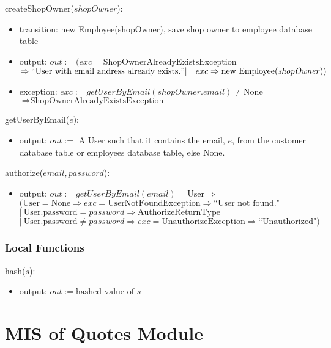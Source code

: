 \documentclass[12pt, titlepage]{article}
\begin{document}
\noindent createShopOwner($shopOwner$):
\begin{itemize}
	\item transition: new Employee(shopOwner), save shop owner to employee database table
	\item output: $out := (exc = \text{ShopOwnerAlreadyExistsException}$ \\ $\Rightarrow ``\text{User with
			      email address already exists.}" |\ \neg exc \Rightarrow \text{new Employee(\emph{shopOwner})})$
	\item exception: $exc := getUserByEmail(shopOwner.email) \neq \text{None}$ \\ $\Rightarrow
		      \text{ShopOwnerAlreadyExistsException}$
\end{itemize}

\noindent getUserByEmail($e$):
\begin{itemize}
	\item output: $out :=$ A User such that it contains the email, $e$, from the customer database table or
	      employees database table, else None.
\end{itemize}

\noindent authorize($email, password$):
\begin{itemize}
	\item output: $out := getUserByEmail(email) = \text{User} \Rightarrow $ \\ $(\text{User} = \text{None}
		      \Rightarrow exc = \text{UserNotFoundException} \Rightarrow \text{``User not found."}$ \\ $|\
		      \text{User.password} = password \Rightarrow \text{AuthorizeReturnType}$ \\ $|\ \text{User.password}
		      \neq password \Rightarrow exc = \text{UnauthorizeException} \Rightarrow \text{``Unauthorized"})$
\end{itemize}

\subsubsection{Local Functions}

\noindent hash($s$):
\begin{itemize}
	\item output: $out := \text{hashed value of } s$
\end{itemize}

\newpage

\section{MIS of Quotes Module} \label{mQuotes}
\end{document}
